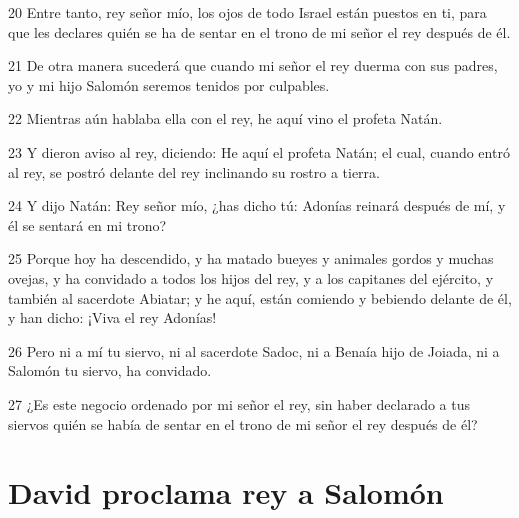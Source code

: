 \par 20 Entre tanto, rey señor mío, los ojos de todo Israel están puestos en ti, para que les declares quién se ha de sentar en el trono de mi señor el rey después de él.
\par 21 De otra manera sucederá que cuando mi señor el rey duerma con sus padres, yo y mi hijo Salomón seremos tenidos por culpables.
\par 22 Mientras aún hablaba ella con el rey, he aquí vino el profeta Natán.
\par 23 Y dieron aviso al rey, diciendo: He aquí el profeta Natán; el cual, cuando entró al rey, se postró delante del rey inclinando su rostro a tierra.
\par 24 Y dijo Natán: Rey señor mío, ¿has dicho tú: Adonías reinará después de mí, y él se sentará en mi trono?
\par 25 Porque hoy ha descendido, y ha matado bueyes y animales gordos y muchas ovejas, y ha convidado a todos los hijos del rey, y a los capitanes del ejército, y también al sacerdote Abiatar; y he aquí, están comiendo y bebiendo delante de él, y han dicho: ¡Viva el rey Adonías!
\par 26 Pero ni a mí tu siervo, ni al sacerdote Sadoc, ni a Benaía hijo de Joiada, ni a Salomón tu siervo, ha convidado.
\par 27 ¿Es este negocio ordenado por mi señor el rey, sin haber declarado a tus siervos quién se había de sentar en el trono de mi señor el rey después de él?

\section*{David proclama rey a Salomón}

